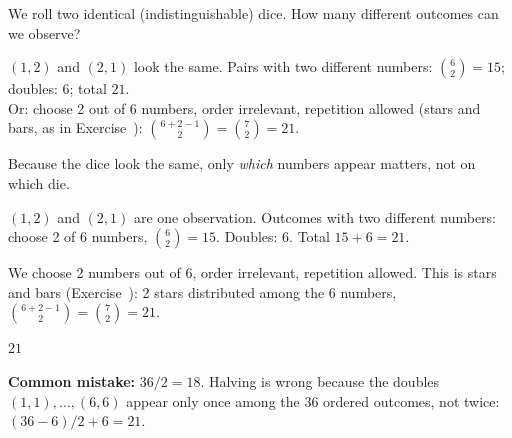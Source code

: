 
\begin{problem}
	We roll two identical (indistinguishable) dice. How many different outcomes
	can we observe?
\end{problem}

\begin{slides}
	\small
	\exstatement
	\pause
	\sol
	$(1,2)$ and $(2,1)$ look the same. Pairs with two different numbers:
	$\binom62=15$; doubles: $6$; total $21$.\\[1mm]
	Or: choose 2 out of 6 numbers, order irrelevant, repetition allowed (stars
	and bars, as in Exercise~):
	$\binom{6+2-1}{2}=\binom72 = 21$.
\end{slides}

\begin{solution}
	\idea Because the dice look the same, only \emph{which} numbers appear
	matters, not on which die.

	 $(1,2)$ and $(2,1)$ are one observation. Outcomes with two
	different numbers: choose 2 of 6 numbers, $\binom62=15$. Doubles: $6$.
	Total $15+6=21$.

	 We choose 2 numbers out of 6, order irrelevant,
	repetition allowed. This is stars and bars (Exercise~):
	2 stars distributed among the 6 numbers, $\binom{6+2-1}{2}=\binom72=21$.
	\begin{answer}
		$21$
	\end{answer}
	\begin{remark}
		\textbf{Common mistake:} $36/2=18$. Halving is wrong because the doubles
		$(1,1),\dots,(6,6)$ appear only once among the 36 ordered outcomes, not
		twice: $(36-6)/2+6=21$.
	\end{remark}
\end{solution}
